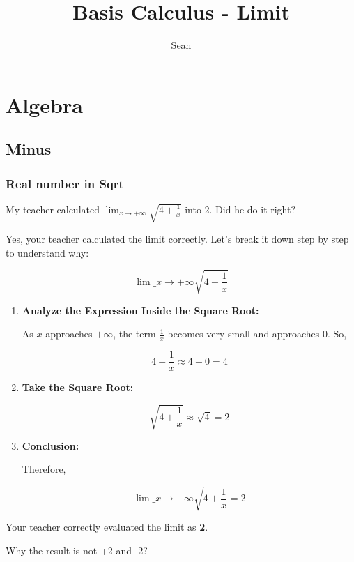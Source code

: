 \documentclass[a4paper,12pt]{book}
\begin{document}
	
\title{Basis Calculus - Limit}
\author{Sean}

\maketitle

\tableofcontents

\newpage

\chapter{Algebra}

\section{Minus}

\subsection{Real number in Sqrt}

My teacher calculated \( \lim_{x\to +\infty} \sqrt{4+\frac{1}{x}} \) into 2. Did he do it right?

Yes, your teacher calculated the limit correctly. Let's break it down step by step to understand why:

\[
\lim\_{x\to +\infty} \sqrt{4+\frac{1}{x}}
\]

\begin{enumerate}
\item 
\textbf{Analyze the Expression Inside the Square Root:}

As \( x \) approaches \( +\infty \), the term \( \frac{1}{x} \) becomes very small and approaches 0. So,

\[
4 + \frac{1}{x} \approx 4 + 0 = 4
\]

\item 
\textbf{Take the Square Root:}

\[
\sqrt{4 + \frac{1}{x}} \approx \sqrt{4} = 2
\]

\item 
\textbf{Conclusion:}

Therefore,

\[
\lim\_{x\to +\infty} \sqrt{4+\frac{1}{x}} = 2
\]

\end{enumerate}

Your teacher correctly evaluated the limit as \textbf{2}.

Why the result is not +2 and -2?
\end{document}
